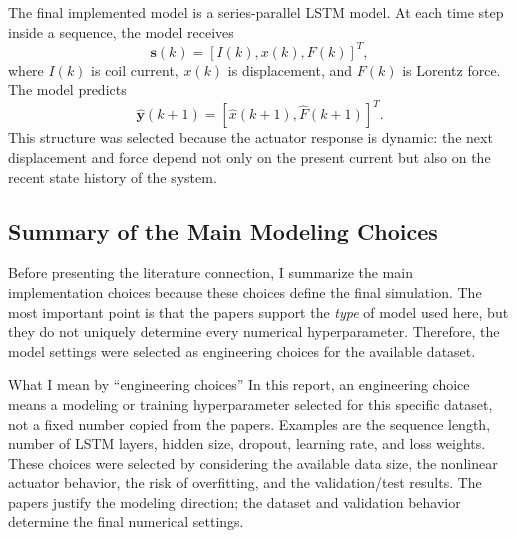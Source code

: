 \documentclass[11pt]{article}
\newcommand{\vect}[1]{\mathbf{#1}}
\begin{document}
The final implemented model is a series-parallel LSTM model. At each time step inside a sequence, the model receives
\begin{equation}
\vect{s}(k) = \left[I(k), x(k), F(k)\right]^T,
\end{equation}
where $I(k)$ is coil current, $x(k)$ is displacement, and $F(k)$ is Lorentz force. The model predicts
\begin{equation}
\hat{\vect{y}}(k+1)=\left[\hat{x}(k+1), \hat{F}(k+1)\right]^T.
\end{equation}
This structure was selected because the actuator response is dynamic: the next displacement and force depend not only on the present current but also on the recent state history of the system.

\subsection{Summary of the Main Modeling Choices}
Before presenting the literature connection, I summarize the main implementation choices because these choices define the final simulation. The most important point is that the papers support the \emph{type} of model used here, but they do not uniquely determine every numerical hyperparameter. Therefore, the model settings were selected as engineering choices for the available dataset.

\begin{parameterdecisionbox}{What I mean by ``engineering choices''}
In this report, an engineering choice means a modeling or training hyperparameter selected for this specific dataset, not a fixed number copied from the papers. Examples are the sequence length, number of LSTM layers, hidden size, dropout, learning rate, and loss weights. These choices were selected by considering the available data size, the nonlinear actuator behavior, the risk of overfitting, and the validation/test results. The papers justify the modeling direction; the dataset and validation behavior determine the final numerical settings.
\end{parameterdecisionbox}
\end{document}
